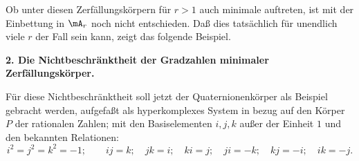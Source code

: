 Ob unter diesen Zerfällungskörpern für $r>1$ auch minimale auftreten, ist mit der Einbettung in $\mA_r$ noch nicht entschieden. Daß dies tatsächlich für unendlich viele $r$ der Fall sein kann, zeigt das folgende Beispiel.

\begin{center}
\textbf{2. Die Nichtbeschränktheit der Gradzahlen minimaler\\
Zerfällungskörper.}
\end{center}

Für diese Nichtbeschränktheit soll jetzt der Quaternionenkörper als Beispiel gebracht werden, aufgefaßt als hyperkomplexes System in bezug auf den Körper $P$ der rationalen Zahlen; mit den Basiselementen $i,j,k$ außer der Einheit $1$ und den bekannten Relationen:
\[
 i^2=j^2=k^2=-1;\qquad ij=k;\quad jk=i;\quad ki=j;\quad ji=-k;\quad kj=-i;\quad ik=-j.
\]
